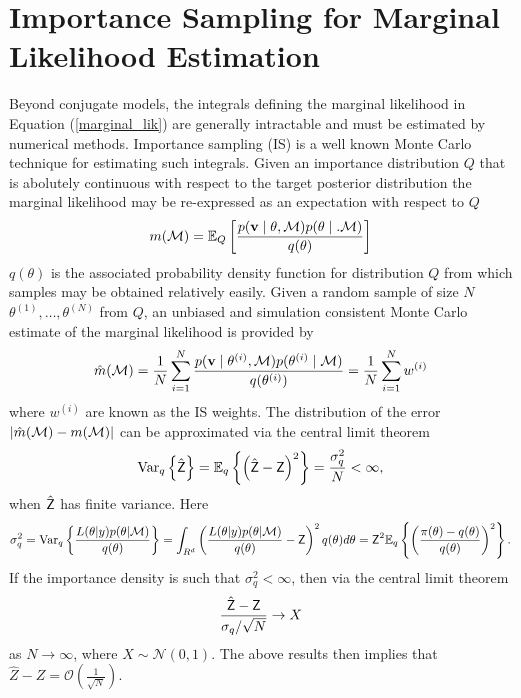 \section{Importance Sampling for Marginal Likelihood Estimation}
\label{sec:IS}
Beyond conjugate models, the integrals defining the marginal
likelihood in Equation (\ref{marginal_lik}) are generally intractable
and must be estimated by numerical methods.  Importance sampling (IS)
\citep{Gewe:1989} is a well known Monte Carlo technique for estimating
such integrals.  Given an importance distribution $Q$ that is
abolutely continuous with respect to the target posterior distribution
the marginal likelihood may be re-expressed as an expectation with
respect to $Q$
\begin{equation}\label{IS_for_marginal_lik}
m(\M ) = \mathbb{E}_Q\left[ \frac{p(\v \mid \theta, \M)p(\theta \mid.
    \M)} {q(\theta)}\right]
\end{equation}
$q(\theta)$ is the associated probability density function for
distribution $Q$ from which samples may be obtained
relatively easily.
Given a random sample of size $N$   $\theta^{(1)},
\ldots, \theta^{(N)}$ from $Q$,
an  unbiased and simulation consistent Monte Carlo
estimate of the marginal likelihood is provided by
\begin{equation}\label{IS_solution_marlik}
\hat{m}(\M)=\frac{1}{N} \sum_{i=1}^N\frac{p(\v \mid \theta^{(i)},
  \M) p(\theta^{(i)}\mid \M)} {q(\theta^{(i)})} = \frac{1}{N}\sum_{i=1}^N
w^{(i)}
\end{equation}
where $w^{(i)}$ are known as the IS weights. 
The distribution of the error
$|\hat{m}({\cal{M}})-m({\cal{M}})|$ can be approximated via the central limit theorem
\begin{equation}
\mbox{Var}_q\left\{\hat{\Z}\right\}=\mathbb{E}_q\left\{\left(\hat{\Z}-\Z\right)^2\right\}=\frac{\sigma_q^2}{N}<\infty,
\end{equation}
when $\hat{\textsf{Z}}$ has finite variance. Here
\begin{equation}
\sigma_q^2=\mbox{Var}_q\left\{\frac{L(\theta|y)p(\theta|\mathcal{M})}{q(\theta)}\right\}=\int_{R^d}\left(\frac{L(\theta|y)p(\theta|\mathcal{M})}{q(\theta)}-\Z\right)^2
q(\theta)d\theta=\Z^2\mathbb{E}_q\left\{\left(\frac{\pi(\theta)-q(\theta)}{q(\theta)}\right)^2\right\}.
\end{equation}
If the importance density is such that $\sigma_q^2<\infty$, then via
the central limit theorem
\begin{equation}
\frac{\hat{\Z}-\Z}{\sigma_q/\sqrt{N}}\rightarrow X
\end{equation}
as $N\rightarrow\infty$, where $X\sim \mathcal{N}(0,1)$. The above
results then implies that
$\hat{Z}-Z=\mathcal{O}(\frac{1}{\sqrt{N}})$.

